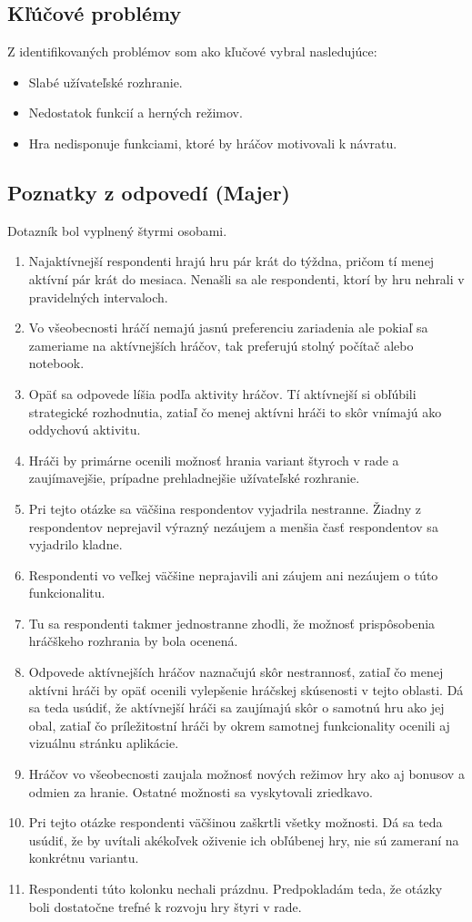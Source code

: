 \documentclass[a4paper, 11pt, onecolumn]{article}
\begin{document}
\subsection*{Kľúčové problémy}
Z identifikovaných problémov som ako kľučové vybral nasledujúce:
\begin{itemize}
    \item Slabé užívateľské rozhranie.
    \item Nedostatok funkcií a herných režimov.
    \item Hra nedisponuje funkciami, ktoré by hráčov motivovali k návratu.
\end{itemize}
\subsection{Poznatky z odpovedí (Majer)}
Dotazník bol vyplnený štyrmi osobami.
\begin{enumerate}
  \item Najaktívnejší respondenti hrajú hru pár krát do týždna, pričom tí menej aktívní pár krát do mesiaca. Nenašli sa
          ale respondenti, ktorí by hru nehrali v pravidelných intervaloch.
  \item Vo všeobecnosti hráčí nemajú jasnú preferenciu zariadenia ale pokiaľ sa zameriame na aktívnejších hráčov, tak preferujú stolný počítač alebo notebook.
  \item Opäť sa odpovede líšia podľa aktivity hráčov. Tí aktívnejší si obľúbili strategické rozhodnutia, zatiaľ čo menej aktívni hráči to skôr vnímajú ako oddychovú aktivitu.
  \item Hráči by primárne ocenili možnosť hrania variant štyroch v rade a zaujímavejšie, prípadne prehladnejšie užívateľské rozhranie.
  \item Pri tejto otázke sa väčšina respondentov vyjadrila nestranne. Žiadny z respondentov neprejavil výrazný nezáujem a menšia časť respondentov sa vyjadrilo kladne.
  \item Respondenti vo veľkej väčšine neprajavili ani záujem ani nezáujem o túto funkcionalitu.
  \item Tu sa respondenti takmer jednostranne zhodli, že možnosť prispôsobenia hráčškeho rozhrania by bola ocenená.
  \item Odpovede aktívnejších hráčov naznačujú skôr nestrannosť, zatiaľ čo menej aktívni hráči by opäť ocenili vylepšenie hráčskej skúsenosti v tejto oblasti.
      Dá sa teda usúdiť, že aktívnejší hráči sa zaujímajú skôr o samotnú hru ako jej obal, zatiaľ čo príležitostní hráči by okrem samotnej funkcionality ocenili aj vizuálnu stránku aplikácie.
  \item Hráčov vo všeobecnosti zaujala možnosť nových režimov hry ako aj bonusov a odmien za hranie. Ostatné možnosti 
      sa vyskytovali zriedkavo.
  \item Pri tejto otázke respondenti väčšinou zaškrtli všetky možnosti. Dá sa teda usúdiť, že by uvítali akékoľvek oživenie ich obľúbenej hry, nie sú zameraní na konkrétnu variantu.
  \item Respondenti túto kolonku nechali prázdnu. Predpokladám teda, že otázky boli dostatočne trefné k rozvoju hry štyri v rade.
\end{enumerate}
\end{document}
